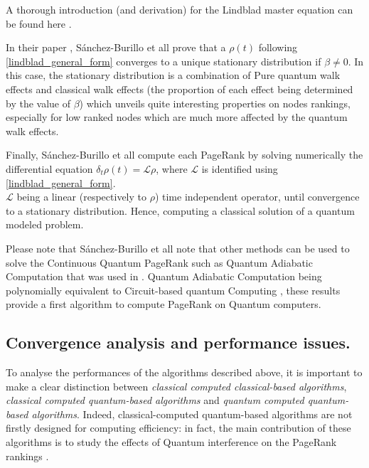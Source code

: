 \documentclass{article}
\begin{document}
A thorough introduction (and derivation) for the Lindblad master equation can be found here \cite{manzano_2020}.

In their paper \cite{sánchez-burillo_duch_gómez-gardeñes_zueco_2012}, Sánchez-Burillo et all prove that a $\rho(t)$ following \eqref{lindblad_general_form} converges to a unique stationary distribution if $\beta \neq 0$. In this case, the stationary distribution is a combination of Pure quantum walk effects and classical walk effects (the proportion of each effect being determined by the value of $\beta$) which unveils quite interesting properties on nodes rankings, especially for low ranked nodes which are much more affected by the quantum walk effects. 

Finally, Sánchez-Burillo et all compute each PageRank by solving numerically the differential equation $\delta_t \rho(t) = \mathcal{L}\rho$, where $\mathcal{L}$ is identified using \eqref{lindblad_general_form}.\\
$\mathcal{L}$ being a linear (respectively to $\rho$) time independent operator, until convergence to a stationary distribution. Hence, computing a classical solution of a quantum modeled problem.

Please note that Sánchez-Burillo et all note that other methods can be used to solve the Continuous Quantum PageRank such as Quantum Adiabatic Computation that was used in \cite{garnerone_zanardi_lidar_2012}. Quantum Adiabatic Computation being polynomially equivalent to Circuit-based quantum Computing \cite{aharonov_dam_kempe_landau_lloyd_regev_2008}, these results provide a first algorithm to compute PageRank on Quantum computers.

\subsection{Convergence analysis and performance issues.}
\label{subsec:performanceIssues}

To analyse the performances of the algorithms described above, it is important to make a clear distinction between \textit{classical computed classical-based algorithms}, \textit{classical computed quantum-based algorithms} and \textit{quantum computed quantum-based algorithms}. Indeed, classical-computed quantum-based algorithms are not firstly designed for computing efficiency: in fact, the main contribution of these algorithms is to study the effects of Quantum interference on the PageRank rankings \cite{paparo_müller_comellas_martin-delgado_2013, sánchez-burillo_duch_gómez-gardeñes_zueco_2012}. 
\end{document}
